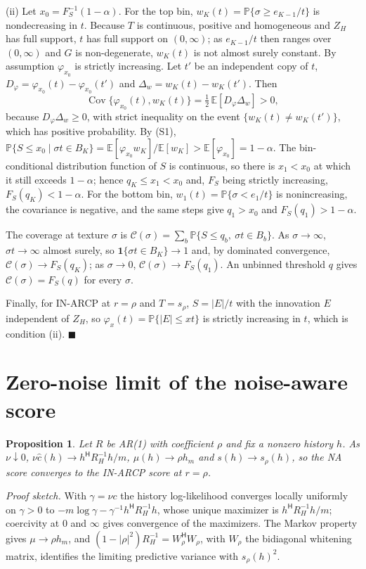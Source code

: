 \documentclass[10pt]{article}
\newtheorem{propS}{Proposition}
\begin{document}
(ii) Let $x_0=F_S^{-1}(1-\alpha)$. For the top bin, $w_K(t)=\mathbb{P}\{\sigma\ge e_{K-1}/t\}$ is nondecreasing in $t$. Because $T$ is continuous, positive and homogeneous and $Z_H$ has full support, $t$ has full support on $(0,\infty)$; as $e_{K-1}/t$ then ranges over $(0,\infty)$ and $G$ is non-degenerate, $w_K(t)$ is not almost surely constant. By assumption $\varphi_{x_0}$ is strictly increasing. Let $t'$ be an independent copy of $t$, $D_\varphi=\varphi_{x_0}(t)-\varphi_{x_0}(t')$ and $\Delta_w=w_K(t)-w_K(t')$. Then
\[
\operatorname{Cov}\{\varphi_{x_0}(t),w_K(t)\}=\tfrac12\,\mathbb E[D_\varphi\Delta_w]>0,
\]
because $D_\varphi\Delta_w\ge0$, with strict inequality on the event $\{w_K(t)\ne w_K(t')\}$, which has positive probability. By (S1),
$\mathbb{P}\{S\le x_0\mid\sigma t\in B_K\}=\mathbb E[\varphi_{x_0}w_K]/\mathbb E[w_K]>\mathbb E[\varphi_{x_0}]=1-\alpha$.
The bin-conditional distribution function of $S$ is continuous, so there is $x_1<x_0$ at which it still exceeds $1-\alpha$; hence $q_K\le x_1<x_0$ and, $F_S$ being strictly increasing, $F_S(q_K)<1-\alpha$. For the bottom bin, $w_1(t)=\mathbb{P}\{\sigma<e_1/t\}$ is nonincreasing, the covariance is negative, and the same steps give $q_1>x_0$ and $F_S(q_1)>1-\alpha$.

The coverage at texture $\sigma$ is $\mathcal C(\sigma)=\sum_b\mathbb{P}\{S\le q_b,\ \sigma t\in B_b\}$. As $\sigma\to\infty$, $\sigma t\to\infty$ almost surely, so $\mathbf 1\{\sigma t\in B_K\}\to1$ and, by dominated convergence, $\mathcal C(\sigma)\to F_S(q_K)$; as $\sigma\to0$, $\mathcal C(\sigma)\to F_S(q_1)$. An unbinned threshold $q$ gives $\mathcal C(\sigma)=F_S(q)$ for every $\sigma$.

Finally, for IN-ARCP at $r=\rho$ and $T=s_\rho$, $S=|E|/t$ with the innovation $E$ independent of $Z_H$, so $\varphi_x(t)=\mathbb{P}\{|E|\le xt\}$ is strictly increasing in $t$, which is condition (ii). \hfill$\blacksquare$

\section{Zero-noise limit of the noise-aware score}
\begin{propS}\label{prop:reduce}
Let $R$ be AR(1) with coefficient $\rho$ and fix a nonzero history $h$. As $\nu\downarrow0$, $\nu\widehat c(h)\to h^{\mathsf H}R_H^{-1}h/m$, $\mu(h)\to\rho h_m$ and $s(h)\to s_\rho(h)$, so the NA score converges to the IN-ARCP score at $r=\rho$.
\end{propS}
\emph{Proof sketch.}
With $\gamma=\nu c$ the history log-likelihood converges locally uniformly on $\gamma>0$ to $-m\log\gamma-\gamma^{-1}h^{\mathsf H}R_H^{-1}h$, whose unique maximizer is $h^{\mathsf H}R_H^{-1}h/m$; coercivity at $0$ and $\infty$ gives convergence of the maximizers. The Markov property gives $\mu\to\rho h_m$, and $(1-|\rho|^2)R_H^{-1}=W_\rho^{\mathsf H}W_\rho$, with $W_\rho$ the bidiagonal whitening matrix, identifies the limiting predictive variance with $s_\rho(h)^2$.
\end{document}
